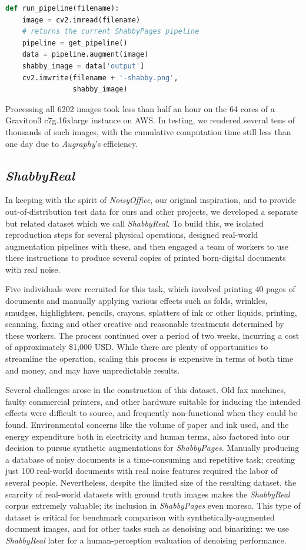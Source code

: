 \documentclass[runningheads]{llncs}
\begin{document}
\begin{lstlisting}[language=Python]
  def run_pipeline(filename):
    image = cv2.imread(filename)
    # returns the current ShabbyPages pipeline
    pipeline = get_pipeline()
    data = pipeline.augment(image)
    shabby_image = data['output']
    cv2.imwrite(filename + '-shabby.png',
                shabby_image)
\end{lstlisting}

Processing all 6202 images took less than half an hour on the 64 cores of a Graviton3 c7g.16xlarge instance on AWS. In testing, we rendered several tens of thousands of such images, with the cumulative computation time still less than one day due to \emph{Augraphy}'s efficiency.

\subsection{\emph{ShabbyReal}}
In keeping with the spirit of \emph{NoisyOffice}, our original inspiration, and to provide out-of-distribution test data for ours and other projects, we developed a separate but related dataset which we call \emph{ShabbyReal}. To build this, we isolated reproduction steps for several physical operations, designed real-world augmentation pipelines with these, and then engaged a team of workers to use these instructions to produce several copies of printed born-digital documents with real noise.

Five individuals were recruited for this task, which involved printing 40 pages of documents and manually applying various effects such as folds, wrinkles, smudges, highlighters, pencils, crayons, splatters of ink or other liquids, printing, scanning, faxing and other creative and reasonable treatments determined by these workers.
The process continued over a period of two weeks, incurring a cost of approximately \$1,000 USD.
While there are plenty of opportunities to streamline the operation, scaling this process is expensive in terms of both time and money, and may have unpredictable results.

Several challenges arose in the construction of this dataset.
Old fax machines, faulty commercial printers, and other hardware suitable for inducing the intended effects were difficult to source, and frequently non-functional when they could be found.
Environmental concerns like the volume of paper and ink used, and the energy expenditure both in electricity and human terms, also factored into our decision to pursue synthetic augmentations for \emph{ShabbyPages}.
Manually producing a database of noisy documents is a time-consuming and repetitive task; creating just 100 real-world documents with real noise features required the labor of several people.
Nevertheless, despite the limited size of the resulting dataset, the scarcity of real-world datasets with ground truth images makes the \emph{ShabbyReal} corpus extremely valuable; its inclusion in \emph{ShabbyPages} even moreso.
This type of dataset is critical for benchmark comparison with synthetically-augmented document images, and for other tasks such as denoising and binarizing: we use \emph{ShabbyReal} later for a human-perception evaluation of denoising performance.
\end{document}
